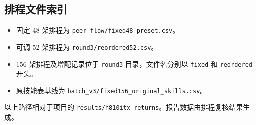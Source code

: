 \documentclass[UTF8,12pt,a4paper,fontset=none]{ctexart}
\begin{document}
\subsection{排程文件索引}
\begin{itemize}
\item 固定 48 架排程为 \texttt{peer\_flow/fixed48\_preset.csv}。
\item 可调 52 架排程为 \texttt{round3/reordered52.csv}。
\item 156 架排程及增配记录位于 \texttt{round3} 目录，文件名分别以 \texttt{fixed} 和 \texttt{reordered} 开头。
\item 原技能表基线为 \texttt{batch\_v3/fixed156\_original\_skills.csv}。
\end{itemize}
以上路径相对于项目的 \texttt{results/h810itx\_returns}。报告数据由排程复核结果生成。
\end{document}
